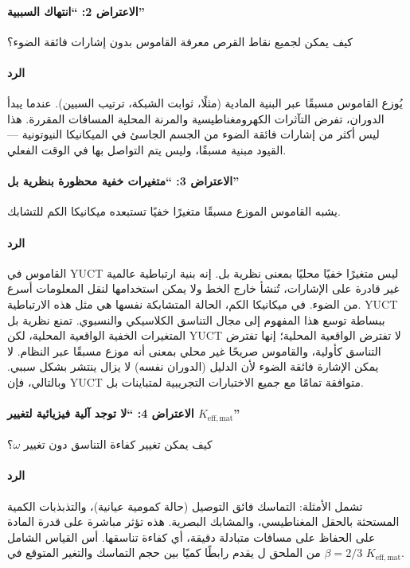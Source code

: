 \documentclass[12pt,a4paper]{article}
\newcommand{\betaf}{\beta}
\begin{document}
	\paragraph{الاعتراض 2: ``انتهاك السببية''}
	كيف يمكن لجميع نقاط القرص معرفة القاموس بدون إشارات فائقة الضوء؟
	
	\paragraph{الرد}
	يُوزع القاموس مسبقًا عبر البنية المادية (مثلًا، ثوابت الشبكة، ترتيب السبين). عندما يبدأ الدوران، تفرض التآثرات الكهرومغناطيسية والمرنة المحلية المسافات المقررة. هذا ليس أكثر من إشارات فائقة الضوء من الجسم الجاسئ في الميكانيكا النيوتونية — القيود مبنية مسبقًا، وليس يتم التواصل بها في الوقت الفعلي.
	
	\paragraph{الاعتراض 3: ``متغيرات خفية محظورة بنظرية بل''}
	يشبه القاموس الموزع مسبقًا متغيرًا خفيًا تستبعده ميكانيكا الكم للتشابك.
	
	\paragraph{الرد}
	القاموس في YUCT ليس متغيرًا خفيًا محليًا بمعنى نظرية بل. إنه بنية ارتباطية عالمية غير قادرة على الإشارات، تُنشأ خارج الخط ولا يمكن استخدامها لنقل المعلومات أسرع من الضوء. في ميكانيكا الكم، الحالة المتشابكة نفسها هي مثل هذه الارتباطية. YUCT ببساطة توسع هذا المفهوم إلى مجال التناسق الكلاسيكي والنسبوي. تمنع نظرية بل المتغيرات الخفية الواقعية المحلية، لكن YUCT لا تفترض الواقعية المحلية؛ إنها تفترض التناسق كأولية، والقاموس صريحًا غير محلي بمعنى أنه موزع مسبقًا عبر النظام. لا يمكن الإشارة فائقة الضوء لأن الدليل (الدوران نفسه) لا يزال ينتشر بشكل سببي. وبالتالي، فإن YUCT متوافقة تمامًا مع جميع الاختبارات التجريبية لمتباينات بل.
	
	\paragraph{الاعتراض 4: ``لا توجد آلية فيزيائية لتغيير \(K_{\mathrm{eff,mat}}\)''}
	كيف يمكن تغيير كفاءة التناسق دون تغيير \(\omega\)؟
	
	\paragraph{الرد}
	تشمل الأمثلة: التماسك فائق التوصيل (حالة كمومية عيانية)، والتذبذبات الكمية المستحثة بالحقل المغناطيسي، والمشابك البصرية. هذه تؤثر مباشرة على قدرة المادة على الحفاظ على مسافات متبادلة دقيقة، أي كفاءة تناسقها. أس القياس الشامل \(\betaf = 2/3\) من الملحق ل يقدم رابطًا كميًا بين حجم التماسك والتغير المتوقع في \(K_{\mathrm{eff,mat}}\).
	
\end{document}
